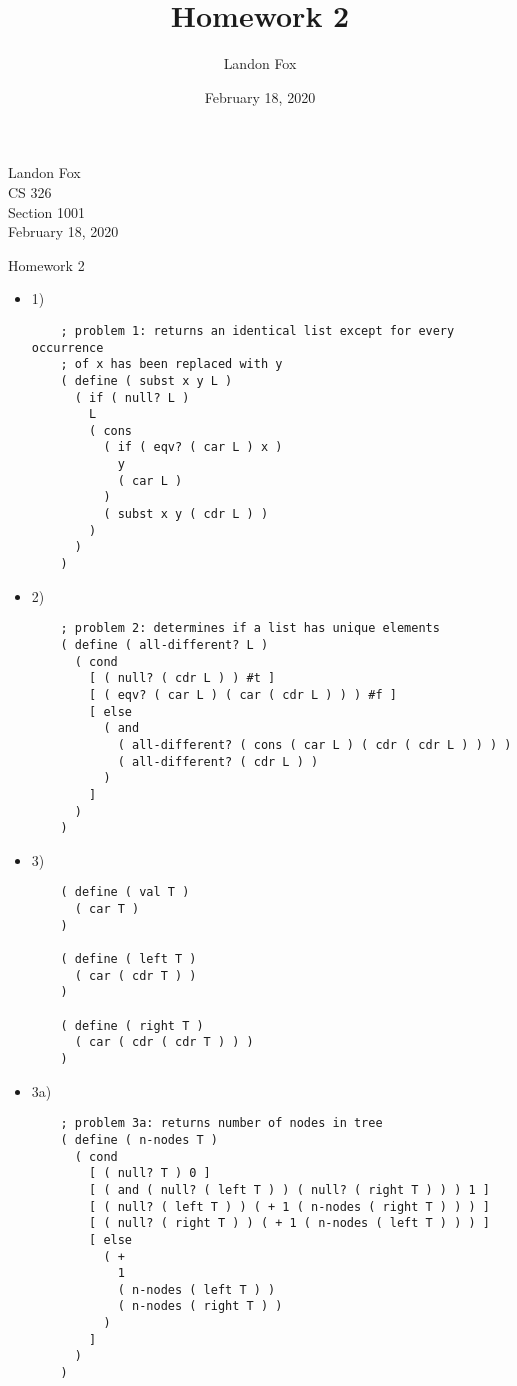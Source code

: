 \documentclass[ 12pt ]{article}
\begin{document}
\title{Homework 2}
\author{Landon Fox}
\date{February 18, 2020}

\begin{flushleft}
Landon Fox \\
CS 326 \\
Section 1001 \\
February 18, 2020
\end{flushleft}
\begin{center}
{\Large Homework 2}
\end{center}


\begin{itemize}
  \item[] {\large 1)}
  \newline
  \begin{lstlisting}
    ; problem 1: returns an identical list except for every occurrence
    ; of x has been replaced with y
    ( define ( subst x y L )
      ( if ( null? L )
        L
        ( cons
          ( if ( eqv? ( car L ) x )
            y
            ( car L )
          )
          ( subst x y ( cdr L ) )
        )
      )
    )
  \end{lstlisting}

  \item[] {\large 2)}
  \newline
  \begin{lstlisting}
    ; problem 2: determines if a list has unique elements
    ( define ( all-different? L )
      ( cond
        [ ( null? ( cdr L ) ) #t ]
        [ ( eqv? ( car L ) ( car ( cdr L ) ) ) #f ]
        [ else
          ( and
            ( all-different? ( cons ( car L ) ( cdr ( cdr L ) ) ) )
            ( all-different? ( cdr L ) )
          )
        ]
      )
    )
  \end{lstlisting}
  \newpage

  \item[] {\large 3)}
  \newline
  \begin{lstlisting}
    ( define ( val T )
      ( car T )
    )

    ( define ( left T )
      ( car ( cdr T ) )
    )

    ( define ( right T )
      ( car ( cdr ( cdr T ) ) )
    )
  \end{lstlisting}

  \item[] {\large 3a)}
  \newline
  \begin{lstlisting}
    ; problem 3a: returns number of nodes in tree
    ( define ( n-nodes T )
      ( cond
        [ ( null? T ) 0 ]
        [ ( and ( null? ( left T ) ) ( null? ( right T ) ) ) 1 ]
        [ ( null? ( left T ) ) ( + 1 ( n-nodes ( right T ) ) ) ]
        [ ( null? ( right T ) ) ( + 1 ( n-nodes ( left T ) ) ) ]
        [ else
          ( +
            1
            ( n-nodes ( left T ) )
            ( n-nodes ( right T ) )
          )
        ]
      )
    )
  \end{lstlisting}
  \newpage


\end{itemize}
\end{document}
